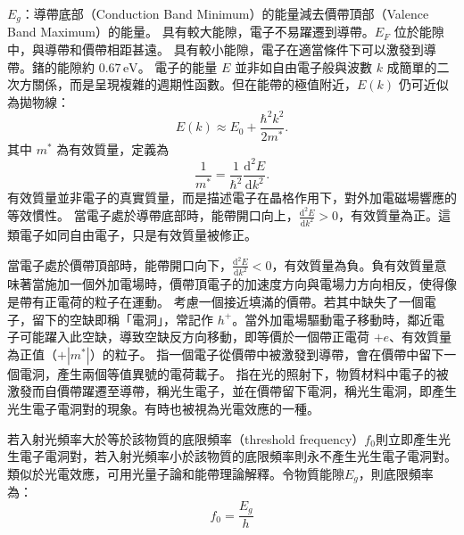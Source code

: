 \documentclass[a4paper,12pt]{article}
\begin{document}
\item{}$E_g$：導帶底部（Conduction Band Minimum）的能量減去價帶頂部（Valence Band Maximum）的能量。
\eit
{}
具有較大能隙，電子不易躍遷到導帶。$E_F$ 位於能隙中，與導帶和價帶相距甚遠。
具有較小能隙，電子在適當條件下可以激發到導帶。鍺的能隙約 \(0.67\,\text{eV}\)。
電子的能量 \(E\) 並非如自由電子般與波數 \(k\) 成簡單的二次方關係，而是呈現複雜的週期性函數。但在能帶的極值附近，\(E(k)\) 仍可近似為拋物線：
\[E(k) \approx E_0 + \frac{\hbar^2 k^2}{2m^*}.\]
其中 \(m^*\) 為有效質量，定義為
\[\frac{1}{m^*}=\frac{1}{\hbar^2} \frac{\mathrm{d}^2E}{\mathrm{d}k^2}.\]
有效質量並非電子的真實質量，而是描述電子在晶格作用下，對外加電磁場響應的等效慣性。
當電子處於導帶底部時，能帶開口向上，$\frac{\mathrm{d}^2E}{\mathrm{d}k^2}>0$，有效質量為正。這類電子如同自由電子，只是有效質量被修正。

當電子處於價帶頂部時，能帶開口向下，$\frac{\mathrm{d}^2E}{\mathrm{d}k^2}<0$，有效質量為負。負有效質量意味著當施加一個外加電場時，價帶頂電子的加速度方向與電場力方向相反，使得像是帶有正電荷的粒子在運動。
考慮一個接近填滿的價帶。若其中缺失了一個電子，留下的空缺即稱「電洞」，常記作 $h^+$。當外加電場驅動電子移動時，鄰近電子可能躍入此空缺，導致空缺反方向移動，即等價於一個帶正電荷 \(+e\)、有效質量為正值（\(+|m^*|\)）的粒子。
指一個電子從價帶中被激發到導帶，會在價帶中留下一個電洞，產生兩個等值異號的電荷載子。
指在光的照射下，物質材料中電子的被激發而自價帶躍遷至導帶，稱光生電子，並在價帶留下電洞，稱光生電洞，即產生光生電子電洞對的現象。有時也被視為光電效應的一種。

若入射光頻率大於等於該物質的底限頻率（threshold frequency）$f_0$則立即產生光生電子電洞對，若入射光頻率小於該物質的底限頻率則永不產生光生電子電洞對。類似於光電效應，可用光量子論和能帶理論解釋。令物質能隙$E_g$，則底限頻率為：
\[f_0=\frac{E_g}{h}\]
\end{document}
